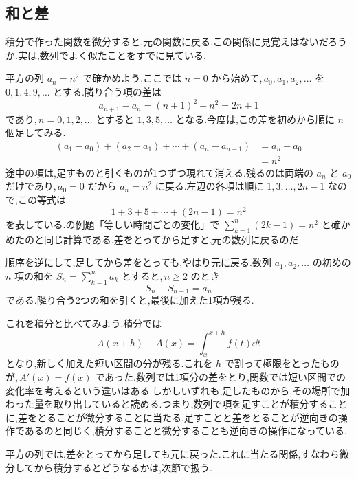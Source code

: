 \subsection{和と差}
積分で作った関数を微分すると,元の関数に戻る.この関係に見覚えはないだろうか.実は,数列でよく似たことをすでに見ている.

平方の列 $a_n=n^2$ で確かめよう.ここでは $n=0$ から始めて,\,$a_0,a_1,a_2,\ldots$ を $0,1,4,9,\ldots$ とする.隣り合う項の差は
\[
 a_{n+1}-a_n=(n+1)^2-n^2=2n+1
\]
であり,\,$n=0,1,2,\ldots$ とすると $1,3,5,\ldots$ となる.今度は,この差を初めから順に $n$ 個足してみる.
\begin{align*}
 (a_1-a_0)+(a_2-a_1)+\cdots+(a_n-a_{n-1})
 &=a_n-a_0\\
 &=n^2
\end{align*}
途中の項は,足すものと引くものが1つずつ現れて消える.残るのは両端の $a_n$ と $a_0$ だけであり,\,$a_0=0$ だから $a_n=n^2$ に戻る.左辺の各項は順に $1,3,\ldots,2n-1$ なので,この等式は
\[
 1+3+5+\cdots+(2n-1)=n^2
\]
を表している.の例題「等しい時間ごとの変化」で $\sum_{k=1}^{n}(2k-1)=n^2$ と確かめたのと同じ計算である.差をとってから足すと,元の数列に戻るのだ.

順序を逆にして,足してから差をとっても,やはり元に戻る.数列 $a_1,a_2,\ldots$ の初めの $n$ 項の和を $S_n=\sum_{k=1}^n a_k$ とすると,\,$n\ge2$ のとき
\[
 S_n-S_{n-1}=a_n
\]
である.隣り合う2つの和を引くと,最後に加えた1項が残る.

これを積分と比べてみよう.積分では
\[
 A(x+h)-A(x)=\int_x^{x+h}f(t)\dd t
\]
となり,新しく加えた短い区間の分が残る.これを $h$ で割って極限をとったものが,\,$A'(x)=f(x)$ であった.数列では1項分の差をとり,関数では短い区間での変化率を考えるという違いはある.しかしいずれも,足したものから,その場所で加わった量を取り出していると読める.つまり,数列で項を足すことが積分することに,差をとることが微分することに当たる.足すことと差をとることが逆向きの操作であるのと同じく,積分することと微分することも逆向きの操作になっている.

平方の列では,差をとってから足しても元に戻った.これに当たる関係,すなわち微分してから積分するとどうなるかは,次節で扱う.
